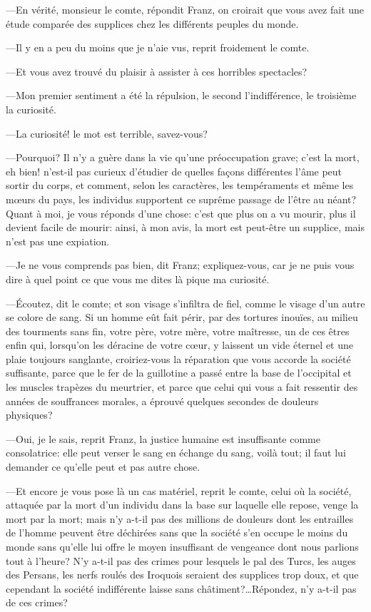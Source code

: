 —En vérité, monsieur le comte, répondit Franz, on croirait que vous avez fait une étude comparée des supplices chez les différents peuples du monde. 

—Il y en a peu du moins que je n'aie vus, reprit froidement le comte. 

—Et vous avez trouvé du plaisir à assister à ces horribles spectacles? 

—Mon premier sentiment a été la répulsion, le second l'indifférence, le troisième la curiosité.  

—La curiosité! le mot est terrible, savez-vous? 

—Pourquoi? Il n'y a guère dans la vie qu'une préoccupation grave; c'est la mort, eh bien! n'est-il pas curieux d'étudier de quelles façons différentes l'âme peut sortir du corps, et comment, selon les caractères, les tempéraments et même les mœurs du pays, les individus supportent ce suprême passage de l'être au néant? Quant à moi, je vous réponds d'une chose: c'est que plus on a vu mourir, plus il devient facile de mourir: ainsi, à mon avis, la mort est peut-être un supplice, mais n'est pas une expiation. 

—Je ne vous comprends pas bien, dit Franz; expliquez-vous, car je ne puis vous dire à quel point ce que vous me dites là pique ma curiosité. 

—Écoutez, dit le comte; et son visage s'infiltra de fiel, comme le visage d'un autre se colore de sang. Si un homme eût fait périr, par des tortures inouïes, au milieu des tourments sans fin, votre père, votre mère, votre maîtresse, un de ces êtres enfin qui, lorsqu'on les déracine de votre cœur, y laissent un vide éternel et une plaie toujours sanglante, croiriez-vous la réparation que vous accorde la société suffisante, parce que le fer de la guillotine a passé entre la base de l'occipital et les muscles trapèzes du meurtrier, et parce que celui qui vous a fait ressentir des années de souffrances morales, a éprouvé quelques secondes de douleurs physiques? 

—Oui, je le sais, reprit Franz, la justice humaine est insuffisante comme consolatrice: elle peut verser le sang en échange du sang, voilà tout; il faut lui demander ce qu'elle peut et pas autre chose. 

—Et encore je vous pose là un cas matériel, reprit le comte, celui où la société, attaquée par la mort d'un individu dans la base sur laquelle elle repose, venge la mort par la mort; mais n'y a-t-il pas des millions de douleurs dont les entrailles de l'homme peuvent être déchirées sans que la société s'en occupe le moins du monde sans qu'elle lui offre le moyen insuffisant de vengeance dont nous parlions tout à l'heure? N'y a-t-il pas des crimes pour lesquels le pal des Turcs, les auges des Persans, les nerfs roulés des Iroquois seraient des supplices trop doux, et que cependant la société indifférente laisse sans châtiment?\dots Répondez, n'y a-t-il pas de ces crimes?  

